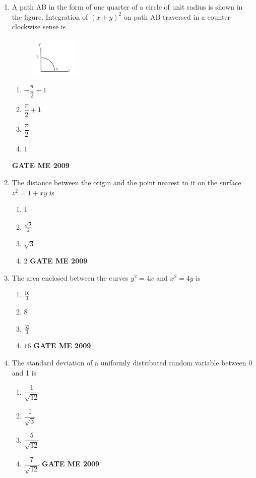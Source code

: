\documentclass[journal]{IEEEtran}
\begin{document}
\begin{enumerate}[leftmargin=0pt]
\item A path AB in the form of one quarter of a circle of unit radius is shown in the figure. Integration of $(x + y)^2$ on path AB traversed in a counter-clockwise sense is
\begin{figure}[h] 
  \centering
  \includegraphics[width=0.23\textwidth]{Figs/image (4).png}
\end{figure}

\begin{enumerate}[label=(\Alph*)]
  \item $-\dfrac{\pi}{2} - 1$
  \item $\dfrac{\pi}{2} + 1$
  \item $\dfrac{\pi}{2}$
  \item $1$
\end{enumerate}
\hfill{\textbf{GATE ME 2009}}


\item The distance between the origin and the point nearest to it on the surface $z^2 = 1+xy$ is
\begin{enumerate}[label=(\Alph*)]
  \item $1$
  \item $\frac{\sqrt{3}}{2}$
  \item $\sqrt{3}$
  \item $2$
\hfill{\textbf{GATE ME 2009}}
\end{enumerate}

\item The area enclosed between the curves $y^2 = 4x$ and $x^2 = 4y$ is
\begin{enumerate}[label=(\Alph*)]
  \item $\frac{16}{3}$
  \item $8$
  \item $\frac{32}{3}$
  \item $16$
\hfill{\textbf{GATE ME 2009}}
\end{enumerate}

\item The standard deviation of a uniformly distributed random variable between 0 and 1 is
\begin{enumerate}[label=(\Alph*)]
  \item $\dfrac{1}{\sqrt{12}}$
  \item $\dfrac{1}{\sqrt{3}}$
  \item $\dfrac{5}{\sqrt{12}}$
  \item $\dfrac{7}{\sqrt{12}}$
\hfill{\textbf{GATE ME 2009}}
\end{enumerate}


\end{enumerate}
\end{document}
